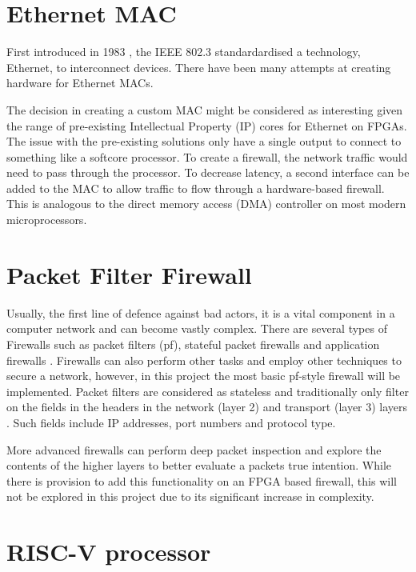 \section{Ethernet MAC}

First introduced in 1983 \cite{IEEE802.3-2012}, the IEEE 802.3 standardardised a technology, Ethernet, to interconnect devices. There have been 
many attempts at creating hardware for Ethernet MACs. 





The decision in creating a custom MAC might be considered as interesting given the range of pre-existing Intellectual 
Property (IP) cores for Ethernet on FPGAs. The issue with the pre-existing solutions only have a single output to connect to something like a softcore
processor. To create a firewall, the network traffic would need to pass through the processor. To decrease latency, a second interface can be added 
to the MAC to allow traffic to flow through a hardware-based firewall. This is analogous to the direct memory access (DMA) controller on most modern 
microprocessors. 



\section{Packet Filter Firewall}

Usually, the first line of defence against bad actors, it is a vital component in a computer network and can become vastly complex. There are several
types of Firewalls such as packet filters (pf), stateful packet firewalls and application firewalls \cite{FirewallsBook}. Firewalls can also perform 
other tasks and employ other techniques to secure a network, however, in this project the most basic pf-style firewall will be implemented. 
Packet filters are considered as stateless and traditionally only filter on the fields in the headers in the network (layer 2) and transport 
(layer 3) layers \cite{FirewallsBook}. Such fields include IP addresses, port numbers and protocol type.

More advanced firewalls can perform deep packet inspection and explore the contents of the higher layers to better evaluate a packets true intention. 
While there is provision to add this functionality on an FPGA based firewall, this will not be explored in this project due to its significant increase 
in complexity. 


\section{RISC-V processor}






